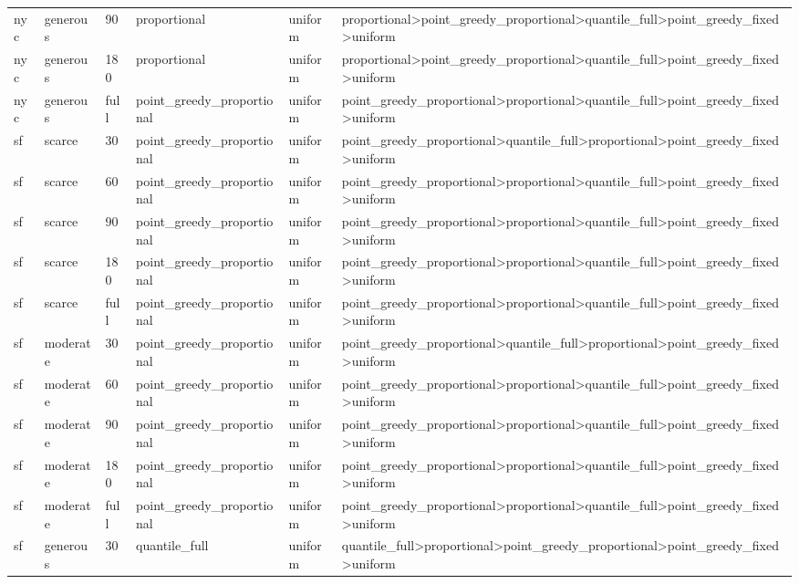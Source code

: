 \begin{tabular}{llllll}
nyc & generous & 90 & proportional & uniform & proportional>point\_greedy\_proportional>quantile\_full>point\_greedy\_fixed>uniform \\
nyc & generous & 180 & proportional & uniform & proportional>point\_greedy\_proportional>quantile\_full>point\_greedy\_fixed>uniform \\
nyc & generous & full & point\_greedy\_proportional & uniform & point\_greedy\_proportional>proportional>quantile\_full>point\_greedy\_fixed>uniform \\
sf & scarce & 30 & point\_greedy\_proportional & uniform & point\_greedy\_proportional>quantile\_full>proportional>point\_greedy\_fixed>uniform \\
sf & scarce & 60 & point\_greedy\_proportional & uniform & point\_greedy\_proportional>proportional>quantile\_full>point\_greedy\_fixed>uniform \\
sf & scarce & 90 & point\_greedy\_proportional & uniform & point\_greedy\_proportional>proportional>quantile\_full>point\_greedy\_fixed>uniform \\
sf & scarce & 180 & point\_greedy\_proportional & uniform & point\_greedy\_proportional>proportional>quantile\_full>point\_greedy\_fixed>uniform \\
sf & scarce & full & point\_greedy\_proportional & uniform & point\_greedy\_proportional>proportional>quantile\_full>point\_greedy\_fixed>uniform \\
sf & moderate & 30 & point\_greedy\_proportional & uniform & point\_greedy\_proportional>quantile\_full>proportional>point\_greedy\_fixed>uniform \\
sf & moderate & 60 & point\_greedy\_proportional & uniform & point\_greedy\_proportional>proportional>quantile\_full>point\_greedy\_fixed>uniform \\
sf & moderate & 90 & point\_greedy\_proportional & uniform & point\_greedy\_proportional>proportional>quantile\_full>point\_greedy\_fixed>uniform \\
sf & moderate & 180 & point\_greedy\_proportional & uniform & point\_greedy\_proportional>proportional>quantile\_full>point\_greedy\_fixed>uniform \\
sf & moderate & full & point\_greedy\_proportional & uniform & point\_greedy\_proportional>proportional>quantile\_full>point\_greedy\_fixed>uniform \\
sf & generous & 30 & quantile\_full & uniform & quantile\_full>proportional>point\_greedy\_proportional>point\_greedy\_fixed>uniform \\

\end{tabular}
